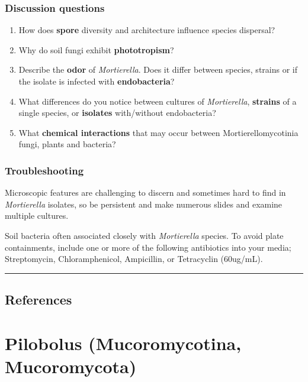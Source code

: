 \documentclass[]{book}
\providecommand{\tightlist}{%
  \setlength{\itemsep}{0pt}\setlength{\parskip}{0pt}}
\begin{document}
\hypertarget{discussion-questions}{%
\subsection{Discussion questions}\label{discussion-questions}}

\begin{enumerate}
\def\labelenumi{\arabic{enumi}.}
\tightlist
\item
  How does \textbf{spore} diversity and architecture influence species dispersal?
\item
  Why do soil fungi exhibit \textbf{phototropism}?
\item
  Describe the \textbf{odor} of \emph{Mortierella}. Does it differ between species, strains or if the isolate is infected with \textbf{endobacteria}?
\item
  What differences do you notice between cultures of \emph{Mortierella}, \textbf{strains} of a single species, or \textbf{isolates} with/without endobacteria?
\item
  What \textbf{chemical interactions} that may occur between Mortierellomycotinia fungi, plants and bacteria?
\end{enumerate}

\hypertarget{troubleshooting-2}{%
\subsection{Troubleshooting}\label{troubleshooting-2}}

Microscopic features are challenging to discern and sometimes hard to find in \emph{Mortierella} isolates, so be persistent and make numerous slides and examine multiple cultures.

Soil bacteria often associated closely with \emph{Mortierella} species. To avoid plate containments, include one or more of the following antibiotics into your media; Streptomycin, Chloramphenicol, Ampicillin, or Tetracyclin (60ug/mL).

\begin{center}\rule{0.5\linewidth}{\linethickness}\end{center}

\hypertarget{references-6}{%
\section{References}\label{references-6}}

\hypertarget{Pilobolus}{%
\chapter{Pilobolus (Mucoromycotina, Mucoromycota)}\label{Pilobolus}}
\end{document}
